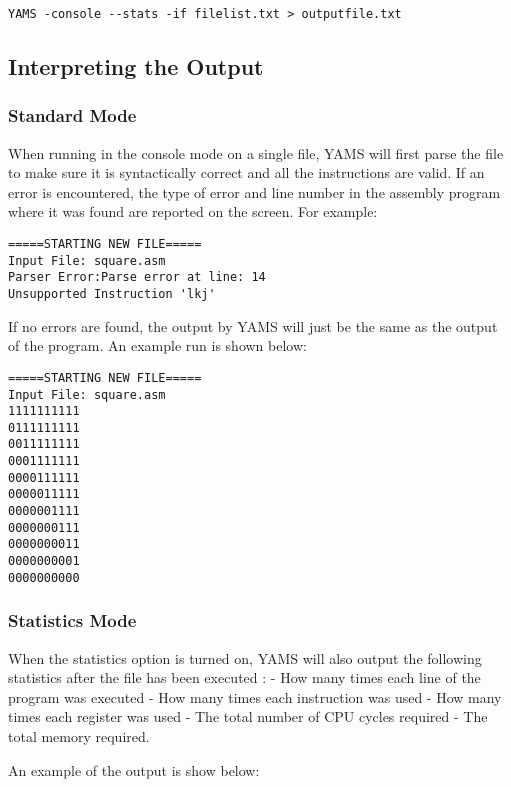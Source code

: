 \documentclass[12pt]{report}
\begin{document}
\begin{verbatim}
YAMS -console --stats -if filelist.txt > outputfile.txt
\end{verbatim}

\subsection{Interpreting the Output}
\subsubsection{Standard Mode}
When running in the console mode on a single file, YAMS will first parse the file to make sure it is syntactically correct and all the instructions are valid.  If an error is encountered, the type of error and line number in the assembly program where it was found are reported on the screen.  For example:

\begin{verbatim}
=====STARTING NEW FILE=====
Input File: square.asm
Parser Error:Parse error at line: 14
Unsupported Instruction 'lkj'
\end{verbatim}

If no errors are found, the output by YAMS will just be the same as the output of the program. An example run is shown below:

\begin{verbatim}
=====STARTING NEW FILE=====
Input File: square.asm
1111111111
0111111111
0011111111
0001111111
0000111111
0000011111
0000001111
0000000111
0000000011
0000000001
0000000000
\end{verbatim}

\subsubsection{Statistics Mode}
When the statistics option is turned on, YAMS will also output the following statistics after the file has been executed :
- How many times each line of the program was executed
- How many times each instruction was used
- How many times each register was used
- The total number of CPU cycles required
- The total memory required.

An example of the output is show below:
\end{document}
